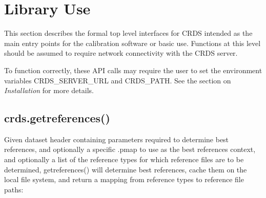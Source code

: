 \documentclass[letterpaper,10pt,english]{sphinxmanual}
\begin{document}
\chapter{Library Use}
\label{top_level_use:library-use}\label{top_level_use::doc}
This section describes the formal top level interfaces for CRDS intended as the
main entry points for the calibration software or basic use.  Functions
at this level should be assumed to require network connectivity with the CRDS
server.

To function correctly,  these API calls may require the user to set the
environment variables CRDS\_SERVER\_URL and CRDS\_PATH.   See the section on
\emph{Installation} for more details.


\section{crds.getreferences()}
\label{top_level_use:crds-getreferences}
Given  dataset header containing parameters required to determine best
references, and optionally a specific .pmap to use as the best references
context,  and optionally a list of the reference types for which reference files
are to be determined,  getreferences() will determine best references,  cache
them on the local file system,  and return a mapping from reference types to
reference file paths:
\end{document}
